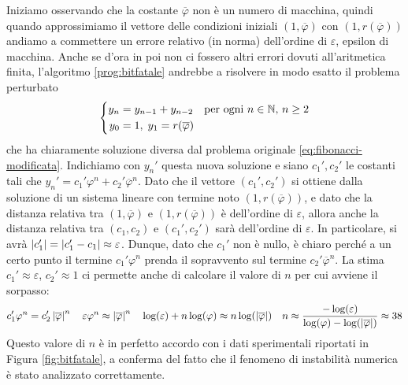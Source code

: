 Iniziamo osservando che la costante $\overline{\varphi}$ non è un numero
di macchina, quindi quando approssimiamo il vettore delle condizioni iniziali
$(1, \overline{\varphi})$ con $(1, r(\overline{\varphi}))$ andiamo a commettere
un errore relativo (in norma) dell'ordine di $\varepsilon$, epsilon di macchina.
Anche se d'ora in poi non ci fossero altri errori dovuti all'aritmetica finita,
l'algoritmo \ref{prog:bitfatale} andrebbe a risolvere in modo esatto il problema
perturbato
\begin{equation*} \label{eq:fibonacci-perturbata}
\left\{
\begin{aligned}
y_n &= y_{n-1} + y_{n-2} \quad \text{per ogni $n \in \mathbb{N}$, $n \geq 2$} \\
y_0 &= 1, \; y_1 = r(\overline{\varphi})
\end{aligned}
\right.
\end{equation*}
che ha chiaramente soluzione diversa dal problema originale
\eqref{eq:fibonacci-modificata}.
Indichiamo con $y_n'$ questa nuova soluzione e siano $c_1',c_2'$
le costanti tali che $y_n' = c_1' \varphi^n + c_2' \overline{\varphi}^n$.
Dato che il vettore $(c_1',c_2')$ si ottiene dalla soluzione di un sistema
lineare con termine noto $(1, r(\overline{\varphi}))$,
e dato che la distanza relativa tra $(1, \overline{\varphi})$
e $(1, r(\overline{\varphi}))$ è dell'ordine di $\varepsilon$,
allora anche la distanza relativa tra $(c_1,c_2)$
e $(c_1',c_2')$ sarà dell'ordine di $\varepsilon$.
In particolare, si avrà $\left\lvert c_1'\right\rvert = \left\lvert c_1'-c_1\right\rvert \approx \varepsilon$.
Dunque, dato che $c_1'$ non è nullo, è chiaro perché
a un certo punto il termine $c_1' \varphi^n$
prenda il sopravvento sul termine $c_2' \overline{\varphi}^n$.
La stima $c_1' \approx \varepsilon$, $c_2' \approx 1$ ci permette anche
di calcolare il valore di $n$ per cui avviene il sorpasso:
\[
c_1' \varphi^n = c_2' \left\lvert\overline{\varphi}\right\rvert^n
\quad \varepsilon \varphi^n \approx \left\lvert\overline{\varphi}\right\rvert^n
\quad \log(\varepsilon) + n \log(\varphi) \approx n \log(\left\lvert\overline{\varphi}\right\rvert)
\quad n \approx \frac{-\log(\varepsilon)}
                     {\log(\varphi) - \log(\left\lvert\overline{\varphi}\right\rvert)}
        \approx 38
\]
Questo valore di $n$ è in perfetto accordo con i dati sperimentali
riportati in Figura \ref{fig:bitfatale}, a conferma del fatto che
il fenomeno di instabilità numerica è stato analizzato correttamente.

